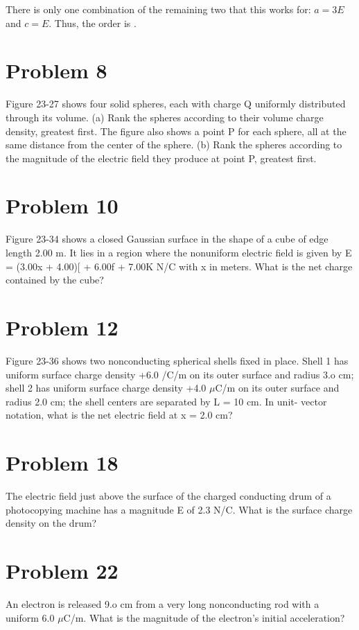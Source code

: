 \documentclass[12pt]{article}
\begin{document}
There is only one combination of the remaining two that this works for: $a = 3E$ and $c = E$. Thus, the order is \boxed{\langle 3\sigma, 2\sigma, \sigma \rangle}.

\pagebreak
\section{Problem 8}
Figure 23-27 shows four solid spheres, each with charge Q uniformly distributed through its volume. (a) Rank the spheres according to their volume charge density, greatest first. The figure also shows a point P for each sphere, all at the same distance from the center of the sphere. (b) Rank the spheres according to the magnitude of the electric field they produce at point P, greatest first.

\section{Problem 10}
Figure 23-34 shows a closed Gaussian surface in the shape of a cube of edge length 2.00 m. It lies in a
region where the nonuniform electric field is given by E = (3.00x + 4.00)[ + 6.00f + 7.00K N/C with x in
meters. What is the net charge contained by the cube?

\section{Problem 12}
Figure 23-36 shows two nonconducting spherical shells fixed in place. Shell 1 has uniform surface
charge density +6.0 /C/m on its outer surface and radius 3.o cm; shell 2 has uniform surface charge density
+4.0 $\mu$C/m on its outer surface and radius 2.0 cm; the shell centers are separated by L = 10 cm. In unit-
vector notation, what is the net electric field at x = 2.0 cm?

\section{Problem 18}
The electric field just above the surface of the charged conducting drum of a photocopying machine has a
magnitude E of 2.3  N/C. What is the surface charge density on the drum?

\section{Problem 22}
An electron is released 9.o cm from a very long nonconducting rod with a uniform 6.0 $\mu$C/m. What is the
magnitude of the electron's initial acceleration?
\end{document}
